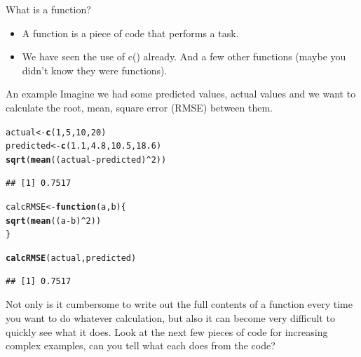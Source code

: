 \documentclass{beamer}\usepackage[]{graphicx}\usepackage[]{color}
\makeatletter
\newcommand{\hlnum}[1]{\textcolor[rgb]{0.686,0.059,0.569}{#1}}%
\newcommand{\hlopt}[1]{\textcolor[rgb]{0,0,0}{#1}}%
\newcommand{\hlstd}[1]{\textcolor[rgb]{0.345,0.345,0.345}{#1}}%
\newcommand{\hlkwa}[1]{\textcolor[rgb]{0.161,0.373,0.58}{\textbf{#1}}}%
\newcommand{\hlkwb}[1]{\textcolor[rgb]{0.69,0.353,0.396}{#1}}%
\newcommand{\hlkwc}[1]{\textcolor[rgb]{0.333,0.667,0.333}{#1}}%
\newcommand{\hlkwd}[1]{\textcolor[rgb]{0.737,0.353,0.396}{\textbf{#1}}}%
\newenvironment{kframe}{%
 \def\at@end@of@kframe{}%
 \ifinner\ifhmode%
  \def\at@end@of@kframe{\end{minipage}}%
  \begin{minipage}{\columnwidth}%
 \fi\fi%
 \def\FrameCommand##1{\hskip\@totalleftmargin \hskip-\fboxsep
 \colorbox{shadecolor}{##1}\hskip-\fboxsep
     \hskip-\linewidth \hskip-\@totalleftmargin \hskip\columnwidth}%
 \MakeFramed {\advance\hsize-\width
   \@totalleftmargin\z@ \linewidth\hsize
   \@setminipage}}%
 {\par\unskip\endMakeFramed%
 \at@end@of@kframe}
\newenvironment{knitrout}{}{} %
\makeatother
\begin{document}
\begin{frame}[fragile]{What is a function?}
\begin{itemize}
\item A function is a piece of code that performs a task.
\item We have seen the use of c() already. And a few other functions (maybe you didn’t know they were functions).
\end{itemize}
An example
Imagine we had some predicted values, actual values and we want to calculate the root, mean, square error (RMSE) between them.
\end{frame}


\begin{frame}[fragile]{}
\begin{knitrout}
\color{fgcolor}\begin{kframe}
\begin{alltt}
\hlstd{actual} \hlkwb{<-} \hlkwd{c}\hlstd{(}\hlnum{1}\hlstd{,} \hlnum{5}\hlstd{,} \hlnum{10}\hlstd{,} \hlnum{20}\hlstd{)}
\hlstd{predicted} \hlkwb{<-} \hlkwd{c}\hlstd{(}\hlnum{1.1}\hlstd{,} \hlnum{4.8}\hlstd{,} \hlnum{10.5}\hlstd{,} \hlnum{18.6}\hlstd{)}
\hlkwd{sqrt}\hlstd{(}\hlkwd{mean}\hlstd{((actual} \hlopt{-} \hlstd{predicted)}\hlopt{^}\hlnum{2}\hlstd{))}
\end{alltt}
\begin{verbatim}
## [1] 0.7517
\end{verbatim}
\begin{alltt}
\hlstd{calcRMSE} \hlkwb{<-} \hlkwa{function}\hlstd{(}\hlkwc{a}\hlstd{,} \hlkwc{b}\hlstd{) \{}
    \hlkwd{sqrt}\hlstd{(}\hlkwd{mean}\hlstd{((a} \hlopt{-} \hlstd{b)}\hlopt{^}\hlnum{2}\hlstd{))}
\hlstd{\}}

\hlkwd{calcRMSE}\hlstd{(actual, predicted)}
\end{alltt}
\begin{verbatim}
## [1] 0.7517
\end{verbatim}
\end{kframe}
\end{knitrout}

\end{frame}


\begin{frame}
Not only is it cumbersome to write out the full contents of a function every time you want to do whatever calculation, but also it can become very difficult to quickly see what it does. %
Look at the next few pieces of code for increasing complex examples, can you tell what each does from the code?
\end{frame}
\end{document}
